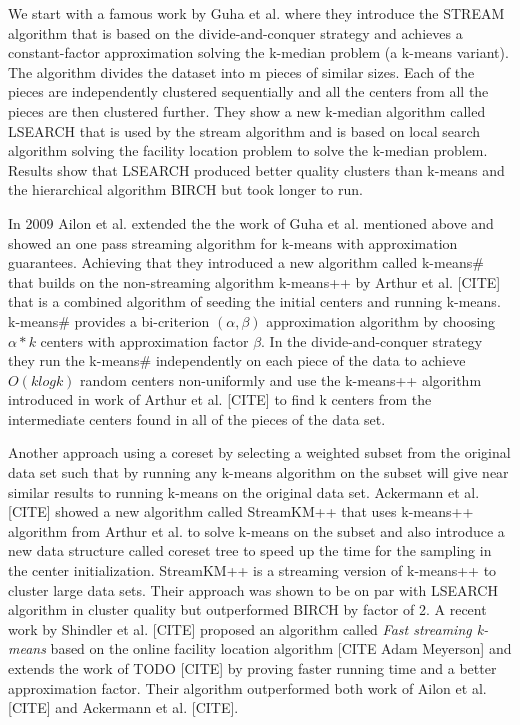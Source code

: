We start with a famous work by Guha et al. \citep{Guha:2003} where they introduce the STREAM algorithm that is based on the divide-and-conquer strategy and achieves a constant-factor approximation solving the k-median problem (a k-means variant). The algorithm divides the dataset into m pieces of similar sizes. Each of the pieces are independently clustered sequentially and all the centers from all the pieces are then clustered further. They show a new k-median algorithm called LSEARCH that is used by the stream algorithm and is based on local search algorithm solving the facility location problem \citep{Charikar:1999} to solve the k-median problem. Results show that LSEARCH produced better quality clusters than k-means and the hierarchical algorithm BIRCH \citep{Zhang:1996} but took longer to run.

In 2009 Ailon et al. \citep{Ailon:2009} extended the the work of Guha et al. mentioned above and showed an one pass streaming algorithm for k-means with approximation guarantees. Achieving that they introduced a new algorithm called k-means\# that builds on the non-streaming algorithm k-means++ by Arthur et al. [CITE] that is a combined algorithm of seeding the initial centers and running k-means. k-means\# provides a bi-criterion $ (\alpha,\beta) $ approximation algorithm by choosing $\alpha * k $ centers with approximation factor $\beta$. In the divide-and-conquer strategy they run the k-means\# independently on each piece of the data to achieve $O(k log k)$ random centers non-uniformly and use the k-means++ algorithm introduced in work of Arthur et al. [CITE] to find k centers from the intermediate centers found in all of the pieces of the data set. 

Another approach using a coreset by selecting a weighted subset from the original data set such that by running any k-means algorithm on the subset will give near similar results to running k-means on the original data set. Ackermann et al. [CITE] showed a new algorithm called StreamKM++ that uses k-means++ algorithm from Arthur et al. to solve k-means on the subset and also introduce a new data structure called coreset tree to speed up the time for the sampling in the center initialization. StreamKM++ is a streaming version of k-means++ to cluster large data sets. Their approach was shown to be on par with LSEARCH algorithm in cluster quality but outperformed BIRCH by factor of 2. A recent work by Shindler et al. [CITE] proposed an algorithm called \textit{Fast streaming k-means} based on the online facility location algorithm [CITE Adam Meyerson] and extends the work of TODO [CITE] by proving faster running time and a better approximation factor. Their algorithm outperformed both work of Ailon et al. [CITE] and Ackermann et al. [CITE].  

